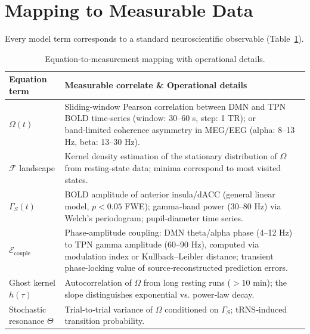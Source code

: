 \documentclass[11pt]{article}
\begin{document}
\section{Mapping to Measurable Data}
Every model term corresponds to a standard neuroscientific observable (Table~\ref{tab:mapping}).

\begin{table}[htbp]
\centering
\caption{Equation‑to‑measurement mapping with operational details.}
\label{tab:mapping}
\begin{tabular}{lp{10cm}}
\toprule
\textbf{Equation term} & \textbf{Measurable correlate \& Operational details} \\
\midrule
$\Omega(t)$ & Sliding‑window Pearson correlation between DMN and TPN BOLD time‑series (window: 30–60 s, step: 1 TR); or band‑limited coherence asymmetry in MEG/EEG (alpha: 8–13 Hz, beta: 13–30 Hz). \\
$\mathcal{F}$ landscape & Kernel density estimation of the stationary distribution of $\Omega$ from resting‑state data; minima correspond to most visited states. \\
$\Gamma_S(t)$ & BOLD amplitude of anterior insula/dACC (general linear model, $p<0.05$ FWE); gamma‑band power (30–80 Hz) via Welch's periodogram; pupil‑diameter time series. \\
$\mathcal{E}_{\text{couple}}$ & Phase‑amplitude coupling: DMN theta/alpha phase (4–12 Hz) to TPN gamma amplitude (60–90 Hz), computed via modulation index or Kullback–Leibler distance; transient phase‑locking value of source‑reconstructed prediction errors. \\
Ghost kernel $h(\tau)$ & Autocorrelation of $\Omega$ from long resting runs ($>10$ min); the slope distinguishes exponential vs. power‑law decay. \\
Stochastic resonance $\Theta$ & Trial‑to‑trial variance of $\Omega$ conditioned on $\Gamma_S$; tRNS‑induced transition probability. \\
\bottomrule
\end{tabular}
\end{table}
\end{document}
